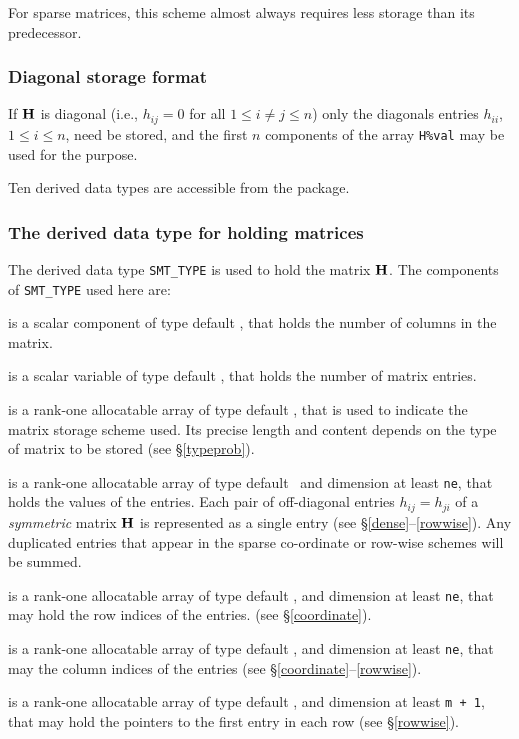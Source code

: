 \documentclass{galahad}
\begin{document}
For sparse matrices, this scheme almost always requires less storage than 
its predecessor.

\subsubsection{Diagonal storage format}\label{diagonal}
If ${\mathbf{H}}$ is diagonal (i.e., $h_{ij} = 0$ for all $1 \leq i \neq j \leq n$)
only the diagonals entries $h_{ii}$, $1 \leq i \leq n$,  need be stored,
and the first $n$ components of the array {\tt H\%val} may be used for 
the purpose. 


\galtypes
Ten derived data types are accessible from the package.


\subsubsection{The derived data type for holding matrices}\label{typesmt}
The derived data type {\tt SMT\_TYPE} is used to hold the matrix ${\mathbf{H}}$. 
The components of {\tt SMT\_TYPE} used here are:

\begin{description}

 is a scalar component of type default \integer, 
that holds the number of columns in the matrix. 
 
 is a scalar variable of type default \integer, that
holds the number of matrix entries.

 is a rank-one allocatable array of type default \character, that
is used to indicate the matrix storage scheme used. Its precise length and
content depends on the type of matrix to be stored (see \S\ref{typeprob}).

 is a rank-one allocatable array of type default \realdp\, 
and dimension at least {\tt ne}, that holds the values of the entries. 
Each pair of off-diagonal entries $h_{ij} = h_{ji}$ of a {\em symmetric}
matrix ${\mathbf{H}}$ is represented as a single entry 
(see \S\ref{dense}--\ref{rowwise}).
Any duplicated entries that appear in the sparse 
co-ordinate or row-wise schemes will be summed. 

 is a rank-one allocatable array of type default \integer, 
and dimension at least {\tt ne}, that may hold the row indices of the entries. 
(see \S\ref{coordinate}).

 is a rank-one allocatable array of type default \integer, 
and dimension at least {\tt ne}, that may the column indices of the entries
(see \S\ref{coordinate}--\ref{rowwise}).

 is a rank-one allocatable array of type default \integer, 
and dimension at least {\tt m + 1}, that may hold the pointers to
the first entry in each row (see \S\ref{rowwise}).

\end{description}
\end{document}
